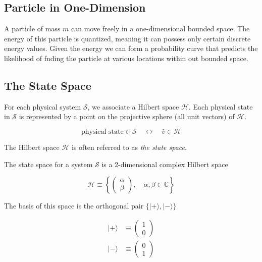 \documentclass{article}
\begin{document}
\subsection{Particle in One-Dimension}

A particle of mass \(m\) can move freely in a one-dimensional bounded space.
The energy of this particle is quantized, meaning it can possess only certain discrete energy values.
Given the energy we can form a probability curve that predicts the likelihood of fnding the particle at various locations within out bounded space.

\subsection{The State Space}

For each physical system \(\mathscr{S}\), we associate a Hilbert space \(\mathcal{H}\).
Each physical state in \(\mathscr{S}\) is represented by a point on the projective sphere (all unit vectors) of \(\mathcal{H}\).

\[
    \text{physical state} \in \mathscr{S} \quad\longleftrightarrow\quad \hat{v} \in \mathcal{H}
\]

The Hilbert space \(\mathcal{H}\) is often referred to as \textit{the state space}.

The state space for a system \(\mathscr{S}\) is a 2-dimensional complex Hilbert space

\[
    \mathcal{H} \equiv
    \left\{
        \begin{pmatrix}
            \alpha \\
            \beta
        \end{pmatrix}
        ,\quad \alpha ,\beta \in \mathbb{C}
    \right\}
\]

The basis of this space is the orthogonal pair \(\{|+\rangle ,|-\rangle\}\)

\begin{align*}
    |+\rangle &\equiv
    \begin{pmatrix}
        1 \\
        0
    \end{pmatrix} \\
    |-\rangle &\equiv
    \begin{pmatrix}
        0 \\
        1
    \end{pmatrix}
\end{align*}

\end{document}
